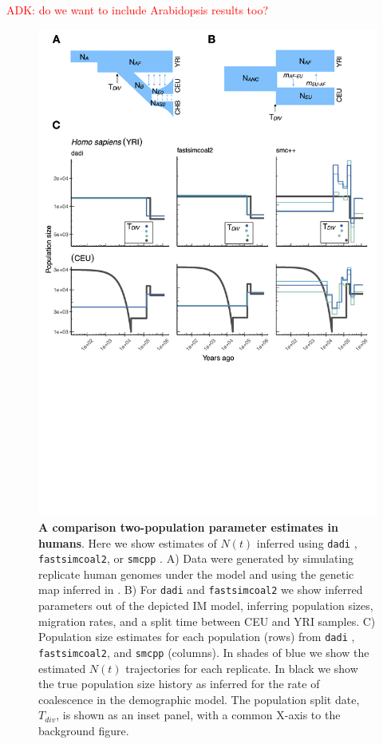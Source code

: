 \documentclass[12pt,halfline,a4paper]{ouparticle}
\newcommand{\dadi}{\texttt{dadi} }
\newcommand{\smcpp}{\texttt{smcpp} }
\newcommand{\adk}[1]{\textcolor{red}{ADK: #1}}
\begin{document}
\adk{do we want to include Arabidopsis results too?}


\begin{figure}
\begin{center}
\includegraphics[width=0.7\linewidth]{display_items/homo_sapiens_two_popn_comp.png}
\caption{\textbf{A comparison two-population parameter estimates in humans}. Here we show estimates of $N(t)$ inferred using \dadi, \texttt{fastsimcoal2}, or \smcpp.
A) Data were generated by simulating
replicate human genomes under the \cite{gutenkunst2009inferring} model and using the genetic map
inferred in \cite{international2007second}. B) For \dadi and \texttt{fastsimcoal2} we show inferred
parameters out of the depicted IM model, inferring population sizes, migration rates, and a split
time between CEU and YRI samples. C) Population size estimates for each population (rows)
from \dadi, \texttt{fastsimcoal2}, and \smcpp (columns). In shades of blue we show the estimated
$N(t)$ trajectories for each replicate. In black we show the true population size history as inferred
for the rate of coalescence in the demographic model. The population split date, $T_{div}$, is shown as
an inset panel, with a common X-axis to the background figure.}
\label{fig:IM_popn_human}
\end{center}
\end{figure}
\end{document}
